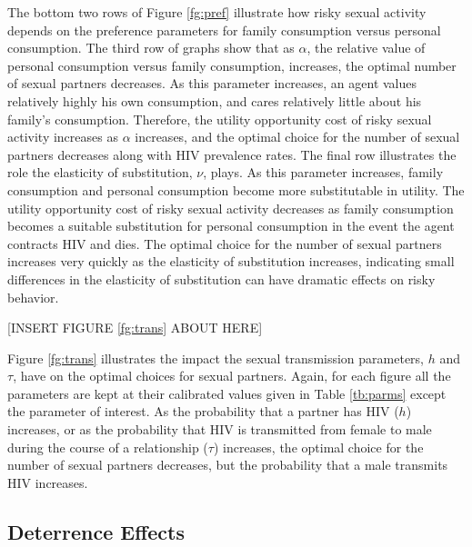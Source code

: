 \documentclass[12pt]{article}
\begin{document}
The bottom two rows of Figure \ref{fg:pref} illustrate how risky sexual activity depends on the preference parameters for family consumption versus personal consumption.  The third row of graphs show that as $\alpha$, the relative value of personal consumption versus family consumption, increases, the optimal number of sexual partners decreases.  As this parameter increases, an agent values relatively highly his own consumption, and cares relatively little about his family's consumption.  Therefore, the utility opportunity cost of risky sexual activity increases as $\alpha$ increases, and the optimal choice for the number of sexual partners decreases along with HIV prevalence rates.  The final row illustrates the role the elasticity of substitution, $\nu$, plays.  As this parameter increases, family consumption and personal consumption become more substitutable in utility.  The utility opportunity cost of risky sexual activity decreases as family consumption becomes a suitable substitution for personal consumption in the event the agent contracts HIV and dies.  The optimal choice for the number of sexual partners increases very quickly as the elasticity of substitution increases, indicating small differences in the elasticity of substitution can have dramatic effects on risky behavior.

\begin{center}[INSERT FIGURE \ref{fg:trans} ABOUT HERE]\end{center}

Figure \ref{fg:trans} illustrates the impact the sexual transmission parameters, $h$ and $\tau$, have on the optimal choices for sexual partners.  Again, for each figure all the parameters are kept at their calibrated values given in Table \ref{tb:parms} except the parameter of interest.  As the probability that a partner has HIV ($h$) increases, or as the probability that HIV is transmitted from female to male during the course of a relationship ($\tau$) increases, the optimal choice for the number of sexual partners decreases, but the probability that a male transmits HIV increases.

\subsection{Deterrence Effects}
\end{document}

